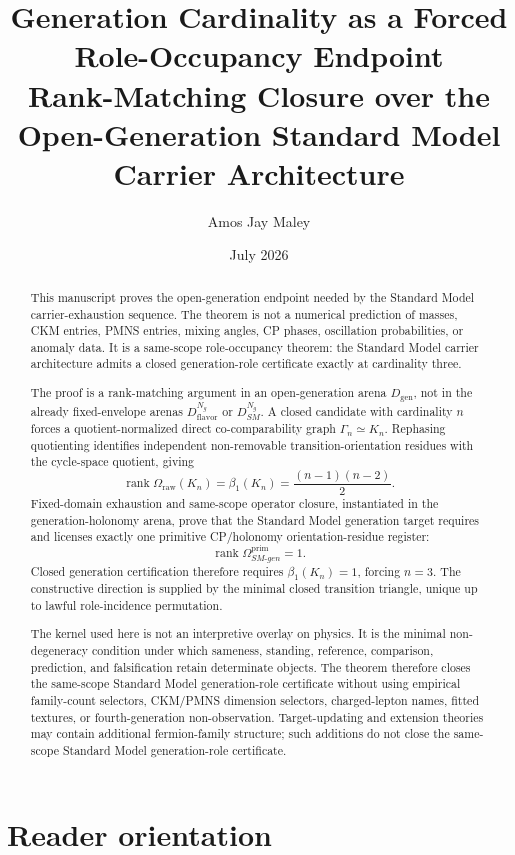 \documentclass[11pt]{article}
\title{\textbf{Generation Cardinality as a Forced Role-Occupancy Endpoint}\\[0.35em]\large Rank-Matching Closure over the Open-Generation Standard Model Carrier Architecture}
\author{Amos Jay Maley}
\date{July 2026}
\newcommand{\Dgen}{D_{\mathrm{gen}}}
\newcommand{\DflavNg}{D_{\mathrm{flavor}}^{N_g}}
\newcommand{\DSMN}{D_{SM}^{N_g}}
\newcommand{\rank}{\operatorname{rank}}
\theoremstyle{definition}
\theoremstyle{plain}
\theoremstyle{remark}
\begin{document}
\maketitle

\begin{abstract}
This manuscript proves the open-generation endpoint needed by the Standard Model carrier-exhaustion sequence. The theorem is not a numerical prediction of masses, CKM entries, PMNS entries, mixing angles, CP phases, oscillation probabilities, or anomaly data. It is a same-scope role-occupancy theorem: the Standard Model carrier architecture admits a closed generation-role certificate exactly at cardinality three.

The proof is a rank-matching argument in an open-generation arena \(\Dgen\), not in the already fixed-envelope arenas \(\DflavNg\) or \(\DSMN\). A closed candidate with cardinality \(n\) forces a quotient-normalized direct co-comparability graph \(\Gamma_n\simeq K_n\). Rephasing quotienting identifies independent non-removable transition-orientation residues with the cycle-space quotient, giving
\[
\rank \Omega_{\mathrm{raw}}(K_n)=\beta_1(K_n)=\frac{(n-1)(n-2)}{2}.
\]
Fixed-domain exhaustion and same-scope operator closure, instantiated in the generation-holonomy arena, prove that the Standard Model generation target requires and licenses exactly one primitive CP/holonomy orientation-residue register:
\[
\rank \Omega_{SM\text{-}gen}^{\mathrm{prim}}=1.
\]
Closed generation certification therefore requires \(\beta_1(K_n)=1\), forcing \(n=3\). The constructive direction is supplied by the minimal closed transition triangle, unique up to lawful role-incidence permutation.

The kernel used here is not an interpretive overlay on physics. It is the minimal non-degeneracy condition under which sameness, standing, reference, comparison, prediction, and falsification retain determinate objects. The theorem therefore closes the same-scope Standard Model generation-role certificate without using empirical family-count selectors, CKM/PMNS dimension selectors, charged-lepton names, fitted textures, or fourth-generation non-observation. Target-updating and extension theories may contain additional fermion-family structure; such additions do not close the same-scope Standard Model generation-role certificate.
\end{abstract}

\tableofcontents
\newpage

\section{Reader orientation}
\end{document}
